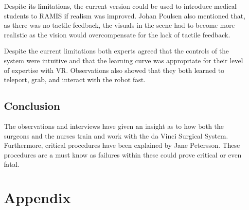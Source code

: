 \documentclass[paper=a4, fontsize=11pt]{scrartcl} %
\numberwithin{equation}{section} %
\numberwithin{figure}{section} %
\numberwithin{table}{section} %
\begin{document}
Despite its limitations, the current version could be used to introduce medical students to RAMIS if realism was improved. Johan Poulsen also mentioned that, as there was no tactile feedback, the visuals in the scene had to become more realistic as the vision would overcompensate for the lack of tactile feedback. 

Despite the current limitations both experts agreed that the controls of the system were intuitive and that the learning curve was appropriate for their level of expertise with VR. Observations also showed that they both learned to teleport, grab, and interact with the robot fast.


\section{Conclusion}
The observations and interviews have given an insight as to how both the surgeons and the nurses train and work with the da Vinci Surgical System. Furthermore, critical procedures have been explained by Jane Petersson. These procedures are a must know as failures within these could prove critical or even fatal.




\newpage
\appendix
\chapter{Appendix}

\end{document}
